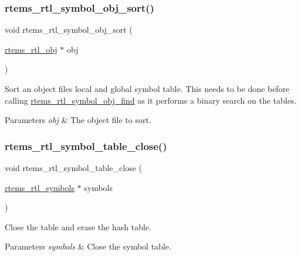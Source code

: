 \subsubsection{\texorpdfstring{rtems\_rtl\_symbol\_obj\_sort()}{rtems\_rtl\_symbol\_obj\_sort()}}
{\footnotesize\ttfamily void rtems\+\_\+rtl\+\_\+symbol\+\_\+obj\+\_\+sort (\begin{DoxyParamCaption}\item[{\mbox{\hyperlink{structrtems__rtl__obj}{rtems\+\_\+rtl\+\_\+obj}} $\ast$}]{obj }\end{DoxyParamCaption})}

Sort an object file\textquotesingle{}s local and global symbol table. This needs to be done before calling \mbox{\hyperlink{rtl-sym_8c_a98e04c5083c6560c69802ee44b839459}{rtems\+\_\+rtl\+\_\+symbol\+\_\+obj\+\_\+find}} as it performs a binary search on the tables.


\begin{DoxyParams}{Parameters}
{\em obj} & The object file to sort. \\
\hline
\end{DoxyParams}
\mbox{\label{rtl-sym_8c_ac18c51aca9023a082b359e672c8838e6}} 
\subsubsection{\texorpdfstring{rtems\_rtl\_symbol\_table\_close()}{rtems\_rtl\_symbol\_table\_close()}}
{\footnotesize\ttfamily void rtems\+\_\+rtl\+\_\+symbol\+\_\+table\+\_\+close (\begin{DoxyParamCaption}\item[{\mbox{\hyperlink{structrtems__rtl__symbols}{rtems\+\_\+rtl\+\_\+symbols}} $\ast$}]{symbols }\end{DoxyParamCaption})}

Close the table and erase the hash table.


\begin{DoxyParams}{Parameters}
{\em symbols} & Close the symbol table. \\
\hline
\end{DoxyParams}
\mbox{\label{rtl-sym_8c_a833c85e22a03d0c816411f6b88ea5bbf}} 
